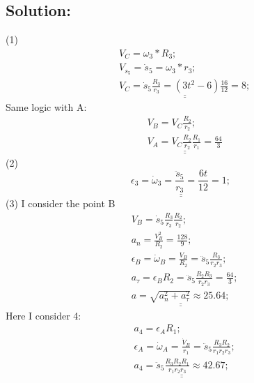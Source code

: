 \documentclass[a4paper,11pt,oneside,article]{memoir}
\def\doubleunderline#1{\underline{\underline{#1}}}
\begin{document}
\subsection{Solution:}
(1)\\
\begin{equation*}
    \begin{split}
            & V_C = \omega_3 * R_3; \\
            & V_{s_5} = \dot s_5  = \omega_3 * r_3; \\
            &
            \doubleunderline{
             V_C = \dot s_5 \frac{R_3}{r_3} = (3t^2 - 6) \frac{16}{12} = 8;
            }
    \end{split}
\end{equation*}
Same logic with A:
\begin{equation*}
    \begin{split}
            & V_B = V_C \frac{R_2}{r_2}; \\
            & 
            \doubleunderline{
            V_A = V_C \frac{R_2}{r_2} \frac{R_1}{r_1} = \frac{64}{3} 
            }
    \end{split}
\end{equation*}
(2)
\begin{equation*}
\doubleunderline{
    \epsilon_3 = \dot \omega_3 = \frac{\ddot s_5}{r_3} = \frac{6t}{12} = 1;
}
\end{equation*}
(3)
I consider the point B
\begin{equation*}
    \begin{split}
            & V_B = \dot s_5\frac{R_3}{r_3} \frac{R_2}{r_2}; \\
            & a_n = \frac{V^2_B}{R_2} = \frac{128}{9};\\
            & \epsilon_B = \dot \omega_B = \frac{V_B}{R_2} = \ddot s_5\frac{R_3}{r_2 r_3}; \\
            & a_{\tau} = \epsilon_B R_2 = \ddot s_5\frac{R_2 R_3}{r_2 r_3} = \frac{64}{3};\\
            &
            \doubleunderline{
            a = \sqrt{a^2_n + a^2_{\tau}} \approx 25.64;
            }
    \end{split}
\end{equation*}
Here I consider 4: 
\begin{equation*}
    \begin{split}
            & a_4 = \epsilon_A R_1;\\
            & \epsilon_A = \dot \omega_A = \frac{\dot V_B}{r_1} = \ddot s_5 \frac{R_3 R_2}{r_1 r_2 r_3};\\
            &
            \doubleunderline{
            a_4 = \ddot s_5 \frac{R_3 R_2 R_1}{r_1 r_2 r_3} \approx 42.67;
            }
    \end{split}
\end{equation*}
\end{document}
